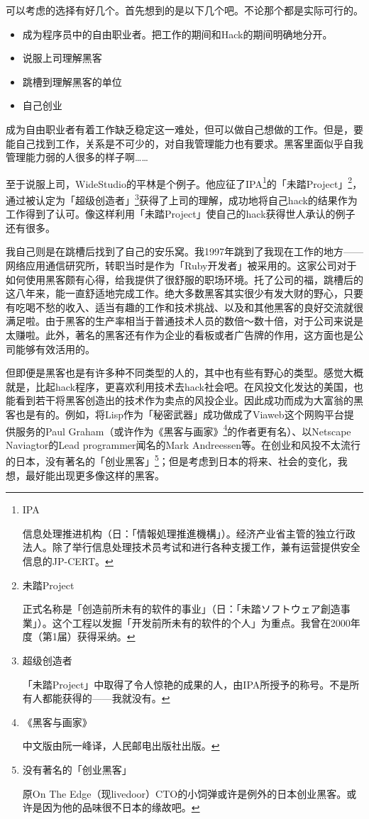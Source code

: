 \documentclass[a4paper,12pt]{article}
\newcommand\ja[1]{{\CJKfamily{gothic}#1}}
\begin{document}
可以考虑的选择有好几个。首先想到的是以下几个吧。不论那个都是实际可行的。
\begin{itemize}
	\item 成为程序员中的自由职业者。把工作的期间和Hack的期间明确地分开。
	\item 说服上司理解黑客
	\item 跳槽到理解黑客的单位
	\item 自己创业
\end{itemize}

成为自由职业者有着工作缺乏稳定这一难处，但可以做自己想做的工作。但是，要能自己找到工作，关系是不可少的，对自我管理能力也有要求。黑客里面似乎自我管理能力弱的人很多的样子啊……

至于说服上司，WideStudio的平林是个例子。他应征了IPA\footnote{IPA

信息处理推进机构（日：「\ja{情報処理推進機構}」）。经济产业省主管的独立行政法人。除了举行信息处理技术员考试和进行各种支援工作，兼有运营提供安全信息的JP-CERT。}的「未踏Project」\footnote{未踏Project
	
正式名称是「创造前所未有的软件的事业」（日：「\ja{未踏ソフトウェア創造事業}」）。这个工程以发掘「开发前所未有的软件的个人」为重点。我曾在2000年度（第1届）获得采纳。}，通过被认定为「超级创造者」\footnote{超级创造者

「未踏Project」中取得了令人惊艳的成果的人，由IPA所授予的称号。不是所有人都能获得的——我就没有。}获得了上司的理解，成功地将自己hack的结果作为工作得到了认可。像这样利用「未踏Project」使自己的hack获得世人承认的例子还有很多。

我自己则是在跳槽后找到了自己的安乐窝。我1997年跳到了我现在工作的地方——网络应用通信研究所，转职当时是作为「Ruby开发者」被采用的。这家公司对于如何使用黑客颇有心得，给我提供了很舒服的职场环境。托了公司的福，跳槽后的这八年来，能一直舒适地完成工作。绝大多数黑客其实很少有发大财的野心，只要有吃喝不愁的收入、适当有趣的工作和技术挑战、以及和其他黑客的良好交流就很满足啦。由于黑客的生产率相当于普通技术人员的数倍～数十倍，对于公司来说是太赚啦。此外，著名的黑客还有作为企业的看板或者广告牌的作用，这方面也是公司能够有效活用的。

但即便是黑客也是有许多种不同类型的人的，其中也有些有野心的类型。感觉大概就是，比起hack程序，更喜欢利用技术去hack社会吧。在风投文化发达的美国，也能看到若干将黑客创造出的技术作为卖点的风投企业。因此成功而成为大富翁的黑客也是有的。例如，将Lisp作为「秘密武器」成功做成了Viaweb这个网购平台提供服务的Paul Graham（或许作为《黑客与画家》\footnote{《黑客与画家》

中文版由阮一峰译，人民邮电出版社出版。}的作者更有名）、以Netscape Naviagtor的Lead programmer闻名的Mark Andreessen等。在创业和风投不太流行的日本，没有著名的「创业黑客」\footnote{没有著名的「创业黑客」

原On The Edge（现livedoor）CTO的小饲弹或许是例外的日本创业黑客。或许是因为他的品味很不日本的缘故吧。}；但是考虑到日本的将来、社会的变化，我想，最好能出现更多像这样的黑客。
\end{document}

